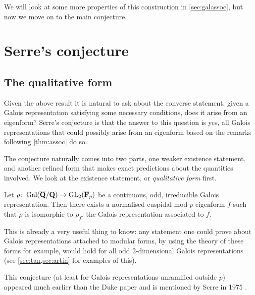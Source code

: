 \documentclass[a4paper,12pt]{article}
\begin{document}

We will look at some more properties of this construction in \cref{sec:galassoc}, but now we move on to the main conjecture.


\section{Serre's conjecture}
\subsection{The qualitative form}
Given the above result it is natural to ask about the converse statement, given a Galois representation satisfying some necessary conditions, does it arise from an eigenform?
Serre's conjecture is that the answer to this question is yes, all Galois representations that could possibly arise from an eigenform based on the remarks following \cref{thm:assoc} do so.

The conjecture naturally comes into two parts, one weaker existence statement, and another refined form that makes exact predictions about the quantities involved.
We look at the existence statement, or \emph{qualitative form} first.

\begin{conjecture}\label{conj:qual}
Let $\rho\colon \operatorname{Gal}(\overline{\mathbf{Q}}/\mathbf{Q}) \to \operatorname{GL}_2(\overline{\mathbf{F}}_p)$ be a continuous, odd, irreducible Galois representation.
Then there exists a normalised cuspidal mod $p$ eigenform $f$ such that $\rho$ is isomorphic to $\rho_f$, the Galois representation associated to $f$.
\end{conjecture}

This is already a very useful thing to know: any statement one could prove about Galois representations attached to  modular forms, by using the theory of these forms for example, would hold for all odd 2-dimensional Galois representations (see \cref{sec:tan,sec:artin} for examples of this). %

This conjecture (at least for Galois representations unramified outside $p$) appeared much earlier than the Duke paper and is mentioned by Serre in 1975 \cite[sec. 3]{Serre75}.
\end{document}
